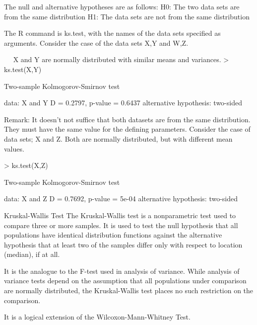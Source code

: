 The null and alternative hypotheses are as follows:
H0: The two data sets are from the same distribution
H1: The data sets are not from the same distribution

The R command is ks.test, with the names of the data sets specified as arguments. Consider the case of the data sets  X,Y and W,Z. 

 
X and Y are normally distributed with similar means and variances. 
> ks.test(X,Y)

        Two-sample Kolmogorov-Smirnov test

data:  X and Y 
D = 0.2797, p-value = 0.6437
alternative hypothesis: two-sided




Remark:  It doesn’t not suffice that both datasets are from the same distribution. They must have the same value for the defining parameters.  Consider the case of data sets; X and Z. Both are normally distributed, but with different mean values. 

> ks.test(X,Z)

        Two-sample Kolmogorov-Smirnov test

data:  X and Z 
D = 0.7692, p-value = 5e-04
alternative hypothesis: two-sided

 Kruskal-Wallis Test
The Kruskal-Wallis test is a nonparametric test used to compare three or more samples. It is used to test the null hypothesis that all populations have identical distribution functions against the alternative hypothesis that at least two of the samples differ only with respect to location (median), if at all.

It is the analogue to the F-test used in analysis of variance. While analysis of variance tests depend on the assumption that all populations under comparison are normally distributed, the Kruskal-Wallis test places no such restriction on the comparison.

It is a logical extension of the Wilcoxon-Mann-Whitney Test.



